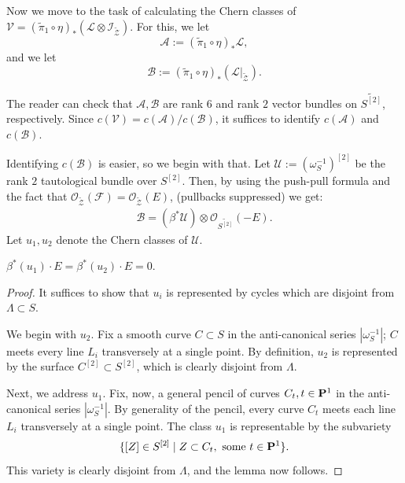 \documentclass[12pt,reqno]{amsart}
\numberwithin{equation}{section}
\renewcommand{\O}{\mathcal O}
\newcommand{\td}{\widetilde}
\newcommand{\V}{\mathcal V}
\begin{document}
Now we move to the task of calculating the Chern classes of
$\V = (\td{\pi}_{1} \circ \eta)_{*}\left(\mathcal{L} \otimes
  \mathcal{I}_{\td{\mathcal{Z}}}\right)$. For this, we
let \[\mathcal{A} := (\td{\pi}_{1} \circ \eta)_{*}\mathcal{L},\] and
we let \[\mathcal{B} := (\td{\pi}_{1} \circ \eta)_{*} \left(
    \mathcal{L}\big|_{\td{\mathcal{Z}}} \right).\]

The reader can check that $\mathcal{A}, \mathcal{B}$ are rank $6$ and
rank $2$ vector bundles on $\td{S^{[2]}}$, respectively.  Since
$c(\V) = c(\mathcal{A})/c(\mathcal{B})$, it suffices to identify
$c(\mathcal{A})$ and $c(\mathcal{B})$.

Identifying $c(\mathcal{B})$ is easier, so we begin with that. Let
$\mathcal{U} := \left( \omega_{S}^{-1} \right)^{[2]}$ be the rank $2$
tautological bundle over $S^{[2]}$.  Then, by using the push-pull
formula and the fact that
$\O_{\td{\mathcal{Z}}}(\mathcal{F}) = \O_{\td{\mathcal{Z}}}(E)$,
(pullbacks suppressed) we get:
\begin{align}
    \label{eq:B}
    \mathcal{B} = \left(\beta^{*}\mathcal{U} \right) \otimes \O_{\td{S^{[2]}}}(-E).
\end{align}
Let $u_{1}, u_{2}$ denote the Chern classes of $\mathcal{U}$.

\begin{lemma}
  \label{lemma:uE}
  $\beta^{*}(u_{1}) \cdot E = \beta^{*}(u_{2}) \cdot E = 0$.
\end{lemma}

\begin{proof}
  It suffices to show that $u_{i}$ is represented by cycles which are
  disjoint from $\Lambda \subset S$.

  We begin with $u_{2}$.  Fix a smooth curve $C \subset S$ in the
  anti-canonical series $|\omega_{S}^{-1}|$; $C$ meets every line
  $L_{i}$ transversely at a single point.  By definition, $u_{2}$ is
  represented by the surface $C^{[2]} \subset S^{[2]}$, which is
  clearly disjoint from $\Lambda$.

  Next, we address $u_{1}$. Fix, now, a general pencil of curves
  $C_{t}, t\in \P^{1}$ in the anti-canonical series
  $|\omega_{S}^{-1}|$.  By generality of the pencil, every curve
  $C_{t}$ meets each line $L_{i}$ transversely at a single point.  The
  class $u_{1}$ is representable by the subvariety
  \[\{[Z] \in S^{[2]} \mid Z \subset C_{t}, \,\, \textrm{some 
      $t\in \P^{1}$}\}.\] This variety is clearly disjoint from
  $\Lambda$, and the lemma now follows.
\end{proof}
\end{document}
